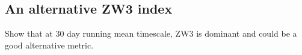 \subsection{An alternative ZW3 index}

Show that at 30 day running mean timescale, ZW3 is dominant and could be a good alternative metric.